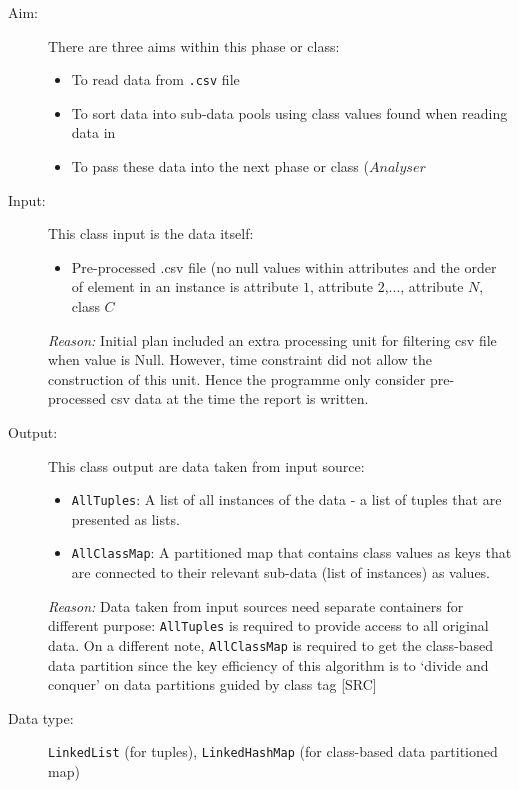 \begin{description}

\item[Aim: ] There are three aims within this phase or class:
\begin{itemize}
	\item{To read data from \texttt{.csv} file} 
	\item{To sort data into sub-data pools using class values found when reading data in} 
	\item{To pass these data into the next phase or class ($Analyser$} 
\end{itemize}

\item[Input: ] This class input is the data itself:
\begin{itemize}
	\item{Pre-processed .csv file (no null values within attributes and the order of element in an instance is {attribute $1$, attribute $2$,..., attribute $N$, class $C$}}
\end{itemize} 

\textit{Reason: } Initial plan included an extra processing unit for filtering csv file when value is Null. However, time constraint did not allow the construction of this unit. Hence the programme only consider pre-processed csv data at the time the report is written.

\item[Output: ] This class output are data taken from input source:
\begin{itemize}
	\item{\texttt{AllTuples}: A list of all instances of the data - a list of tuples that are presented as lists.}
	\item{\texttt{AllClassMap}: A partitioned map that contains class values as keys that are connected to their relevant sub-data (list of instances) as values.}
\end{itemize}
  
\textit{Reason: } Data taken from input sources need separate containers for different purpose: \texttt{AllTuples} is required to provide access to all original data. On a different note, \texttt{AllClassMap} is required to get the class-based data partition since the key efficiency of this algorithm is to `divide and conquer' on data partitions guided by class tag [SRC]

\item[Data type: ] \texttt{LinkedList} (for tuples), \texttt{LinkedHashMap} (for class-based data partitioned map)


\end{description}
